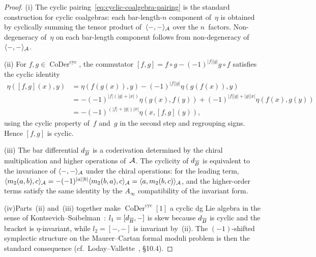 \begin{proof}
(i)\enspace
The cyclic pairing~\eqref{eq:cyclic-coalgebra-pairing} is the
standard construction for cyclic coalgebras:
each bar-length-$n$ component of~$\eta$ is obtained by cyclically
summing the tensor product of~$\langle{-},{-}\rangle_{\mathcal{A}}$ over
the $n$~factors.  Non-degeneracy of~$\eta$ on each bar-length
component follows from non-degeneracy
of~$\langle{-},{-}\rangle_{\mathcal{A}}$.

(ii)\enspace
For $f,g\in\operatorname{CoDer}^{\mathrm{cyc}}$, the
commutator $[f,g] = f\circ g - (-1)^{|f||g|}g\circ f$ satisfies
the cyclic identity
\begin{align*}
\eta([f,g](x),y) &= \eta(f(g(x)),y) -
(-1)^{|f||g|}\eta(g(f(x)),y)\\
&= -(-1)^{|f|(|g|+|x|)}\eta(g(x),f(y))
  + (-1)^{|f||g|+|g||x|}\eta(f(x),g(y))\\
&= -(-1)^{(|f|+|g|)|x|}\eta(x,[f,g](y)),
\end{align*}
using the cyclic property of~$f$ and~$g$ in the second step and
regrouping signs.  Hence $[f,g]$ is cyclic.

(iii)\enspace
The bar differential $d_{\overline{B}}$ is a coderivation determined by
the chiral multiplication and higher operations of~$\mathcal{A}$.
The cyclicity of $d_{\overline{B}}$ is equivalent to the invariance of
$\langle{-},{-}\rangle_{\mathcal{A}}$ under the chiral operations:
for the leading term,
$\langle m_2(a,b),c\rangle_{\mathcal{A}}
= -(-1)^{|a||b|}\langle m_2(b,a),c\rangle_{\mathcal{A}}
= \langle a, m_2(b,c)\rangle_{\mathcal{A}}$,
and the higher-order terms satisfy the same identity by the
$A_\infty$ compatibility of the invariant form.

(iv)\enspace Parts~(ii) and~(iii) together make
$\operatorname{CoDer}^{\mathrm{cyc}}[1]$ a cyclic dg Lie algebra
in the sense of Kontsevich--Soibelman~\cite{KontsevichSoibelman}:
$l_1 = [d_{\overline{B}},-]$ is skew because $d_{\overline{B}}$ is cyclic and
the bracket is $\eta$-invariant, while $l_2 = [-,-]$ is invariant
by~(ii).  The $(-1)$-shifted symplectic structure on the
Maurer--Cartan formal moduli problem is then the standard
consequence (cf.\ Loday--Vallette~\cite{LV12}, \S10.4).
\end{proof}

